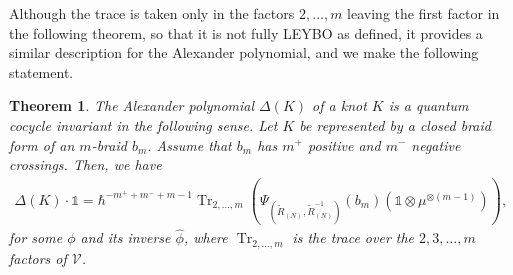 \documentclass[11pt,fleqn]{amsart} %
\DeclareMathOperator{\tr}{Tr}
\newtheorem{theorem}{Theorem}[section]
\begin{document}
Although the trace is taken only in the factors $2, \ldots, m$ leaving the first factor in the following theorem, 
so that it is not fully LEYBO as defined, it provides a similar description for the Alexander polynomial, and 
we make the following statement.


\begin{theorem}\label{thm:Alex}
	The Alexander polynomial $\Delta( K)$ of a  
	knot $ K$ is a  
	quantum cocycle invariant 
	in the following sense. 
		Let $K$ be represented by a closed braid form of an $m$-braid $b_m$. 
		Assume that $b_m$ has $m^+$ positive  and $m^-$ negative crossings. Then, we have
	\begin{eqnarray*}
		\Delta (K) \cdot \mathbb 1 = \hbar^{-m^++m^-+m-1} \tr_{2,\ldots, m}
		(\Psi_{(\tilde R_{(N)}, \tilde R^{-1} _{(N)} ) }(b_m) (\mathbb 1\otimes \mu^{\otimes (m-1)}) ) ,
	\end{eqnarray*}
	for some $\phi$ and its inverse $\hat \phi$, where $\tr_{2,\ldots, m}$ is the trace over the $2, 3, \ldots, m$ factors 
	 of ${\mathcal V}$.
\end{theorem}
\end{document}
